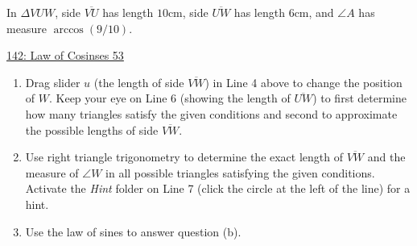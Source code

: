 \documentclass{ximera}
\begin{document}
\begin{question} \label{Q444f44tgHHERER}
In $\Delta VUW$, side $\overline{VU}$ has length $10$cm, side $\overline{UW}$ has length $6$cm, and  $\angle A$ has measure $\arccos(9/10)$.

\begin{onlineOnly}
    \begin{center}
\end{center}
\end{onlineOnly}

\href{https://www.desmos.com/calculator/a2m3iexwfx}{142: Law of Cosinses 53}

\begin{enumerate}
\item Drag slider $u$ (the length of side $\overline{VW}$) in Line 4 above to change the position of $W$. Keep your eye on Line 6 (showing the length of $\overline{UW}$) to first determine how many triangles satisfy the given conditions and second to approximate the possible lengths of side $\overline{VW}$.

\item Use right triangle trigonometry to determine the exact length of $\overline{VW}$ and the measure of $\angle W$ in all possible triangles satisfying the given conditions. Activate the \emph{Hint} folder on Line 7 (click the circle at the left of the line) for a hint.

\item Use the law of sines to answer question (b).

 
\end{enumerate}

\end{question}
\end{document}
